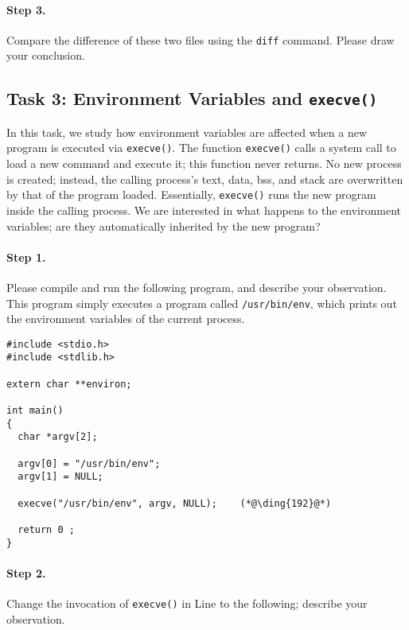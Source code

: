 \paragraph{Step 3.} Compare the difference of these two files using 
the {\tt diff} command. Please draw your conclusion.



\subsection{Task 3: Environment Variables and {\tt execve()}}

In this task, we study how environment variables are affected
when a new program is 
executed via {\tt execve()}. The 
function {\tt execve()} calls a system call to load 
a new command and execute it; this function never returns. 
No new process is created; instead, the calling 
process's text,  data, bss, and stack  are overwritten by that of 
the program loaded. Essentially, {\tt execve()} runs the new program inside
the calling process. We are interested in what happens to the 
environment variables; are they automatically inherited by the 
new program?


\paragraph{Step 1.} Please compile and run the following
program, and describe your observation. This program simply executes
a program called {\tt /usr/bin/env}, which prints out the environment
variables of the current process.

\begin{lstlisting}
#include <stdio.h>
#include <stdlib.h>

extern char **environ;

int main()
{
  char *argv[2];

  argv[0] = "/usr/bin/env"; 
  argv[1] = NULL;

  execve("/usr/bin/env", argv, NULL);    (*@\ding{192}@*)

  return 0 ;
}
\end{lstlisting}


\paragraph{Step 2.} Change the invocation of {\tt execve()} 
in Line  to the following; describe your observation.


